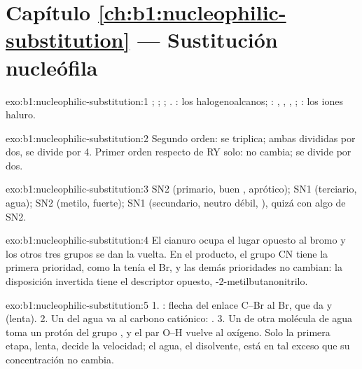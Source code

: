 \section*{Capítulo \ref{ch:b1:nucleophilic-substitution} --- Sustitución nucleófila}

\begin{solution}{exo:b1:nucleophilic-substitution:1}
; ; ;
. : los halogenoalcanos; :
, , , ; : los iones
haluro.
\end{solution}

\begin{solution}{exo:b1:nucleophilic-substitution:2}
Segundo orden: se triplica; ambas divididas por dos, se divide por 4.
Primer orden respecto de RY solo: no cambia; se divide por dos.
\end{solution}

\begin{solution}{exo:b1:nucleophilic-substitution:3}
SN2 (primario, buen , aprótico); SN1 (terciario, agua); SN2
(metilo,  fuerte);  SN1 (secundario, 
neutro débil, ), quizá con algo de SN2.
\end{solution}

\begin{solution}{exo:b1:nucleophilic-substitution:4}
El cianuro ocupa el lugar opuesto al bromo y los otros tres grupos se dan
la vuelta. En el producto, el grupo CN tiene la primera prioridad, como
la tenía el Br, y las demás prioridades no cambian: la disposición
invertida tiene el descriptor opuesto, -2-metilbutanonitrilo.
\end{solution}

\begin{solution}{exo:b1:nucleophilic-substitution:5}
1. : flecha del enlace C--Br al Br, que da  y
 (lenta). 2. Un  del agua va al carbono
catiónico: . 3. Un  de otra molécula de
agua toma un protón del grupo , y el par O--H vuelve al oxígeno.
Solo la primera etapa, lenta, decide la velocidad; el agua, el
disolvente, está en tal exceso que su concentración no cambia.
\end{solution}

